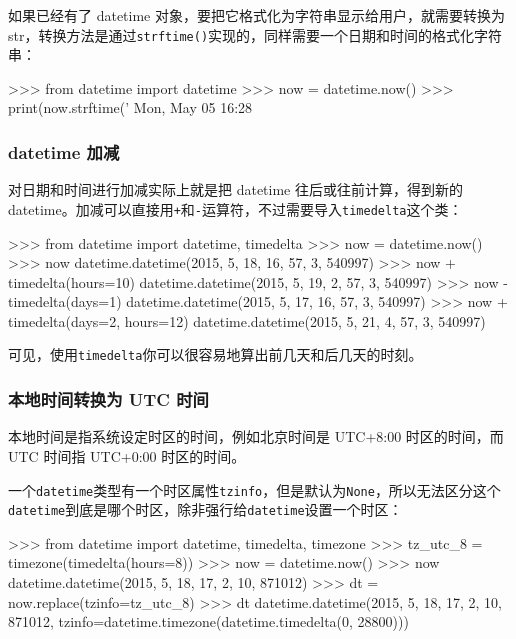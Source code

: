 如果已经有了 datetime 对象，要把它格式化为字符串显示给用户，就需要转换为
str，转换方法是通过\texttt{strftime()}实现的，同样需要一个日期和时间的格式化字符串：

\begin{pythoncode}
>>> from datetime import datetime
>>> now = datetime.now()
>>> print(now.strftime('%
Mon, May 05 16:28
\end{pythoncode}

\hypertarget{datetime-ux52a0ux51cf}{%
\subsubsection{datetime 加减}\label{datetime-ux52a0ux51cf}}

对日期和时间进行加减实际上就是把 datetime 往后或往前计算，得到新的
datetime。加减可以直接用\texttt{+}和\texttt{-}运算符，不过需要导入\texttt{timedelta}这个类：

\begin{pythoncode}
>>> from datetime import datetime, timedelta
>>> now = datetime.now()
>>> now
datetime.datetime(2015, 5, 18, 16, 57, 3, 540997)
>>> now + timedelta(hours=10)
datetime.datetime(2015, 5, 19, 2, 57, 3, 540997)
>>> now - timedelta(days=1)
datetime.datetime(2015, 5, 17, 16, 57, 3, 540997)
>>> now + timedelta(days=2, hours=12)
datetime.datetime(2015, 5, 21, 4, 57, 3, 540997)
\end{pythoncode}

可见，使用\texttt{timedelta}你可以很容易地算出前几天和后几天的时刻。

\hypertarget{ux672cux5730ux65f6ux95f4ux8f6cux6362ux4e3a-utc-ux65f6ux95f4}{%
\subsubsection{本地时间转换为 UTC
时间}\label{ux672cux5730ux65f6ux95f4ux8f6cux6362ux4e3a-utc-ux65f6ux95f4}}

本地时间是指系统设定时区的时间，例如北京时间是 UTC+8:00 时区的时间，而
UTC 时间指 UTC+0:00 时区的时间。

一个\texttt{datetime}类型有一个时区属性\texttt{tzinfo}，但是默认为\texttt{None}，所以无法区分这个\texttt{datetime}到底是哪个时区，除非强行给\texttt{datetime}设置一个时区：

\begin{pythoncode}
>>> from datetime import datetime, timedelta, timezone
>>> tz_utc_8 = timezone(timedelta(hours=8)) 
>>> now = datetime.now()
>>> now
datetime.datetime(2015, 5, 18, 17, 2, 10, 871012)
>>> dt = now.replace(tzinfo=tz_utc_8) 
>>> dt
datetime.datetime(2015, 5, 18, 17, 2, 10, 871012, tzinfo=datetime.timezone(datetime.timedelta(0, 28800)))
\end{pythoncode}

